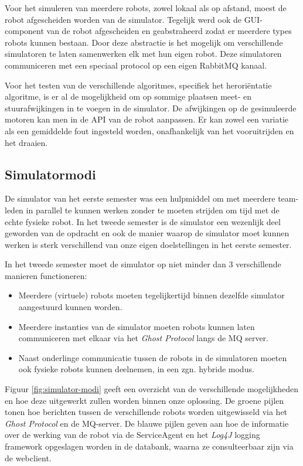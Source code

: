 \documentclass[12pt,a4paper]{report}
\begin{document}
Voor het simuleren van meerdere robots, zowel lokaal als op afstand, moest de robot afgescheiden worden van de simulator. Tegelijk werd ook de GUI-component van de robot afgescheiden en geabstraheerd zodat er meerdere types robots kunnen bestaan. Door deze abstractie is het mogelijk om verschillende simulatoren te laten samenwerken elk met hun eigen robot. Deze simulatoren communiceren met een speciaal protocol op een eigen RabbitMQ kanaal.

Voor het testen van de verschillende algoritmes, specifiek het herori\"entatie algoritme, is er al de mogelijkheid om op sommige plaatsen meet- en stuurafwijkingen in te voegen in de simulator. De afwijkingen op de gesimuleerde motoren kan men in de API van de robot aanpassen. Er kan zowel een variatie als een gemiddelde fout ingesteld worden, onafhankelijk van het vooruitrijden en het draaien.

\subsection{Simulatormodi}

De simulator van het eerste semester was een hulpmiddel om met meerdere team-leden in parallel te kunnen werken zonder te moeten strijden om tijd met de echte fysieke robot. In het tweede semester is de simulator een wezenlijk deel geworden van de opdracht en ook de manier waarop de simulator moet kunnen werken is sterk verschillend van onze eigen doelstellingen in het eerste semester.

In het tweede semester moet de simulator op niet minder dan 3 verschillende manieren functioneren:

\begin{itemize}
\item Meerdere (virtuele) robots moeten tegelijkertijd binnen dezelfde simulator aangestuurd kunnen worden.
\item Meerdere instanties van de simulator moeten robots kunnen laten communiceren met elkaar via het \emph{Ghost Protocol} langs de MQ server.
\item Naast onderlinge communicatie tussen de robots in de simulatoren moeten ook fysieke robots kunnen deelnemen, in een zgn. hybride modus.
\end{itemize}

Figuur \ref{fig:simulator-modi} geeft een overzicht van de verschillende mogelijkheden en hoe deze uitgewerkt zullen worden binnen onze oplossing. De groene pijlen tonen hoe berichten tussen de verschillende robots worden uitgewisseld via het \emph{Ghost Protocol} en de MQ-server. De blauwe pijlen geven aan hoe de informatie over de werking van de robot via de ServiceAgent en het \emph{Log4J} logging framework opgeslagen worden in de databank, waarna ze consulteerbaar zijn via de webclient.
\end{document}
